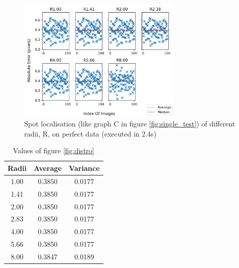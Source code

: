 \documentclass[aps,pra,a4paper,nofootinbib,onecolumn,tightenlines,longbibliography,12pt,amsfonts,amssymb,amsmath,floatfix]{revtex4-2} %
\begin{document}
  \begin{figure}[H]
    \begin{center}
      \includegraphics[width=0.7\textwidth]{project_pics/no_noise_all_r.png}
    \end{center}
    \caption{Spot localisation (like graph C in figure \ref{fig:single_test}) of different radii, R, on perfect data (executed in 2.4s)}
    \label{fig:no_noise_all_r}
  \end{figure}

\begin{table}[H]
\begin{center}
\begin{tabular}{||c || c c||} 
 \hline
 Radii & Average & Variance \\ [0.5ex] 
 \hline\hline
 1.00 &  0.3850& 0.0177 \\ 
 \hline  
 1.41 &  0.3850& 0.0177  \\
 \hline 
 2.00 &  0.3850& 0.0177 \\
 \hline 
 2.83 &  0.3850& 0.0177 \\
 \hline 
 4.00 &  0.3850&  0.0177 \\ 
 \hline 
 5.66 &  0.3850& 0.0177 \\
 \hline
 8.00 &  0.3847& 0.0189\\ [1ex] 
 \hline
\end{tabular}
\end{center}
\caption{Values of figure \ref{fig:distro}}
\label{table1}
\end{table}

\end{document}
